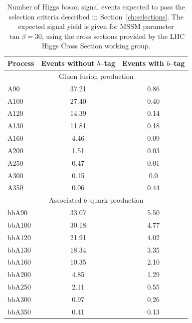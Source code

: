 \begin{table}[t]
\begin{center}
\begin{tabular}{|l|c|c|}
\hline
Process & Events without $b$--tag & Events with $b$--tag \\
\hline
\hline
\multicolumn{3}{|c|}{Gluon fusion production} \\
\hline
A90 & 37.21 & 0.86 \\
A100 & 27.40 & 0.40 \\
A120 & 14.39 & 0.14 \\
A130 & 11.81 & 0.18 \\
A160 & 4.46 & 0.09 \\
A200 & 1.51 & 0.03 \\
A250 & 0.47 & 0.01 \\
A300 & 0.15 & 0.0 \\
A350 & 0.06 & 0.44 \\
\hline
\multicolumn{3}{|c|}{Associated $b$--quark production} \\
\hline
bbA90 & 33.07 &  5.50 \\
bbA100 & 30.18 &  4.77 \\
bbA120 & 21.91 & 4.02 \\
bbA130 & 18.34 & 3.35 \\ 
bbA160 & 10.35 &  2.10 \\
bbA200 & 4.85  &  1.29 \\
bbA250 & 2.11 &  0.55 \\
bbA300 & 0.97 &  0.26 \\
bbA350 & 0.41 & 0.13 \\
\hline
\end{tabular}
\caption[Expected signal yields at \mbox{$\tan \beta = 30$}]{Number of Higgs
boson signal events expected to pass the selection criteria described in
Section~\ref{ch:selections}.  The expected signal yield is given for MSSM
parameter \mbox{$\tan \beta = 30$}, using the cross sections provided by the LHC
Higgs Cross Section working group.} \label{tab:SignalExpResultsLooseAHtoMuTau}
\end{center}
\end{table}

